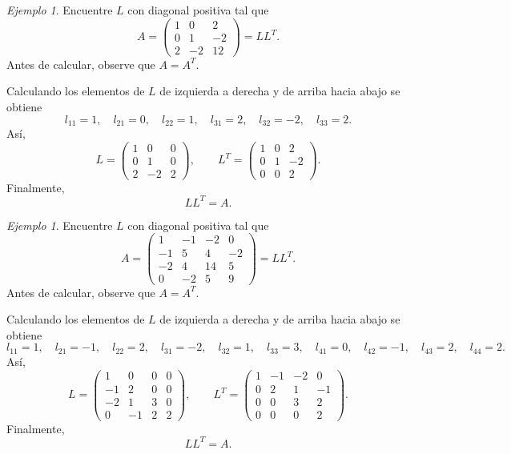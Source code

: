\documentclass[12pt]{article}
\theoremstyle{remark}
\newtheorem{Ejem}[definicion]{Ejemplo}
\begin{document}
\begin{Ejem}

Encuentre $L$ con diagonal positiva tal que
\[
A=\begin{pmatrix}1 & 0 & 2\\0 & 1 & -2\\2 & -2 & 12\end{pmatrix}=LL^T.
\]
Antes de calcular, observe que $A=A^T$.

Calculando los elementos de $L$ de izquierda a derecha y de arriba hacia abajo se obtiene
\[
l_{11}=1,\quad l_{21}=0,\quad l_{22}=1,\quad l_{31}=2,\quad l_{32}=-2,\quad l_{33}=2.
\]
Así,
\[
L=\begin{pmatrix}1 & 0 & 0\\0 & 1 & 0\\2 & -2 & 2\end{pmatrix},\qquad L^T=\begin{pmatrix}1 & 0 & 2\\0 & 1 & -2\\0 & 0 & 2\end{pmatrix}.
\]
Finalmente,
\[
\boxed{LL^T=A}.
\]
\end{Ejem}

\begin{Ejem}

Encuentre $L$ con diagonal positiva tal que
\[
A=\begin{pmatrix}1 & -1 & -2 & 0\\-1 & 5 & 4 & -2\\-2 & 4 & 14 & 5\\0 & -2 & 5 & 9\end{pmatrix}=LL^T.
\]
Antes de calcular, observe que $A=A^T$.

Calculando los elementos de $L$ de izquierda a derecha y de arriba hacia abajo se obtiene
\[
l_{11}=1,\quad l_{21}=-1,\quad l_{22}=2,\quad l_{31}=-2,\quad l_{32}=1,\quad l_{33}=3,\quad l_{41}=0,\quad l_{42}=-1,\quad l_{43}=2,\quad l_{44}=2.
\]
Así,
\[
L=\begin{pmatrix}1 & 0 & 0 & 0\\-1 & 2 & 0 & 0\\-2 & 1 & 3 & 0\\0 & -1 & 2 & 2\end{pmatrix},\qquad L^T=\begin{pmatrix}1 & -1 & -2 & 0\\0 & 2 & 1 & -1\\0 & 0 & 3 & 2\\0 & 0 & 0 & 2\end{pmatrix}.
\]
Finalmente,
\[
\boxed{LL^T=A}.
\]


\end{Ejem}
\end{document}
